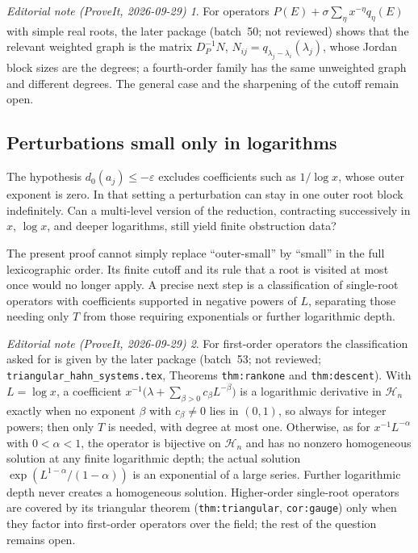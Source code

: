 \documentclass[11pt,a4paper]{article}
\numberwithin{equation}{section}
\theoremstyle{definition}
\theoremstyle{remark}
\newtheorem*{ednote}{Editorial note (ProveIt, 2026-09-29)}
\newcommand{\HH}{\mathcal H}
\newcommand{\dprim}{d_0}
\newcommand{\eps}{\varepsilon}
\begin{document}
\begin{ednote}\label{ed:resonance-graph}
For operators $P(E)+\sigma\sum_\eta x^{-\eta}q_\eta(E)$ with simple real roots, the later package  (batch~50; not reviewed) shows that the relevant weighted graph is the matrix $D_P^{-1}N$, $N_{ij}=q_{\lambda_j-\lambda_i}(\lambda_j)$, whose Jordan block sizes are the degrees; a fourth-order family has the same unweighted graph and different degrees. The general case and the sharpening of the cutoff remain open.
\end{ednote}

\subsection{Perturbations small only in logarithms}
The hypothesis $\dprim(a_j)\le-\eps$ excludes coefficients such as $1/\log x$, whose outer exponent is zero. In that setting a perturbation can stay in one outer root block indefinitely. Can a multi-level version of the reduction, contracting successively in $x$, $\log x$, and deeper logarithms, still yield finite obstruction data?

The present proof cannot simply replace ``outer-small'' by ``small'' in the full lexicographic order. Its finite cutoff and its rule that a root is visited at most once would no longer apply. A precise next step is a classification of single-root operators with coefficients supported in negative powers of $L$, separating those needing only $T$ from those requiring exponentials or further logarithmic depth.

\begin{ednote}\label{ed:log-small}
For first-order operators the classification asked for is given by the later package  (batch~53; not reviewed; \texttt{triangular\_hahn\_systems.tex}, Theorems \texttt{thm:rankone} and \texttt{thm:descent}). With $L=\log x$, a coefficient $x^{-1}\bigl(\lambda+\sum_{\beta>0}c_\beta L^{-\beta}\bigr)$ is a logarithmic derivative in $\HH_n$ exactly when no exponent $\beta$ with $c_\beta\ne0$ lies in $(0,1)$, so always for integer powers; then only $T$ is needed, with degree at most one. Otherwise, as for $x^{-1}L^{-\alpha}$ with $0<\alpha<1$, the operator is bijective on $\HH_n$ and has no nonzero homogeneous solution at any finite logarithmic depth; the actual solution $\exp(L^{1-\alpha}/(1-\alpha))$ is an exponential of a large series. Further logarithmic depth never creates a homogeneous solution. Higher-order single-root operators are covered by its triangular theorem (\texttt{thm:triangular}, \texttt{cor:gauge}) only when they factor into first-order operators over the field; the rest of the question remains open.
\end{ednote}
\end{document}
